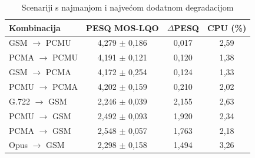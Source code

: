 \begin{table}[htbp]
\centering
\caption{Scenariji s najmanjom i najvećom dodatnom degradacijom}
\label{tab:transcode-extremes}
\small
\begin{tabular}{|l|c|c|c|}
\hline
\textbf{Kombinacija} & \textbf{PESQ MOS-LQO} & \textbf{$\Delta$PESQ} & \textbf{CPU (\%)} \\
\hline
GSM $\rightarrow$ PCMU & 4,279 $\pm$ 0,186 & 0,017 & 2,59 \\
PCMA $\rightarrow$ PCMU & 4,191 $\pm$ 0,121 & 0,120 & 1,38 \\
GSM $\rightarrow$ PCMA & 4,172 $\pm$ 0,254 & 0,124 & 1,33 \\
PCMU $\rightarrow$ PCMA & 4,202 $\pm$ 0,159 & 0,210 & 2,02 \\
\hline
G.722 $\rightarrow$ GSM & 2,246 $\pm$ 0,039 & 2,155 & 2,63 \\
PCMU $\rightarrow$ GSM & 2,492 $\pm$ 0,093 & 1,920 & 2,34 \\
PCMA $\rightarrow$ GSM & 2,548 $\pm$ 0,057 & 1,763 & 2,18 \\
Opus $\rightarrow$ GSM & 2,298 $\pm$ 0,158 & 1,494 & 3,26 \\
\hline
\end{tabular}
\end{table}
